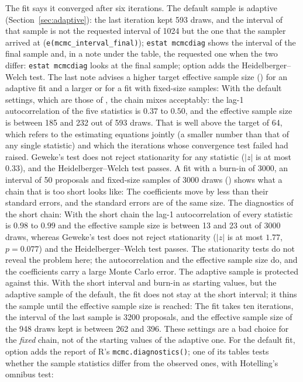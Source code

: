 The fit says it converged after six iterations. The default sample is adaptive (Section~\ref{sec:adaptive}): the last iteration kept 593 draws, and the interval of that sample is not the requested interval of 1024 but the one that the sampler arrived at (\texttt{e(mcmc\_interval\_final)}); \texttt{estat mcmcdiag} shows the interval of the final sample and, in a note under the table, the requested one when the two differ:
\texttt{estat mcmcdiag} looks at the final sample; option  adds the Heidelberger--Welch test. The last note advises a higher target effective sample size () for an adaptive fit and a larger  or  for a fit with fixed-size samples:
With the default settings, which are those of \ergm{}, the chain mixes acceptably: the lag-1 autocorrelation of the five statistics is $0.37$ to $0.50$, and the effective sample size is between 185 and 232 out of 593 draws. That is well above the target of 64, which refers to the estimating equations jointly (a smaller number than that of any single statistic) and which the iterations whose convergence test failed had raised. Geweke's test does not reject stationarity for any statistic ($|z|$ is at most $0.33$), and the Heidelberger--Welch test passes. A fit with a burn-in of 3000, an interval of 50 proposals and fixed-size samples of 3000 draws () shows what a chain that is too short looks like:
The coefficients move by less than their standard errors, and the standard errors are of the same size. The diagnostics of the short chain:
With the short chain the lag-1 autocorrelation of every statistic is $0.98$ to $0.99$ and the effective sample size is between 13 and 23 out of 3000 draws, whereas Geweke's test does not reject stationarity ($|z|$ is at most $1.77$, $p=0.077$) and the Heidelberger--Welch test passes. The stationarity tests do not reveal the problem here; the autocorrelation and the effective sample size do, and the coefficients carry a large Monte Carlo error. The adaptive sample is protected against this. With the short interval and burn-in as starting values, but the adaptive sample of the default, the fit does not stay at the short interval; it thins the sample until the effective sample size is reached:
The fit takes ten iterations, the interval of the last sample is 3200 proposals, and the effective sample size of the 948 draws kept is between 262 and 396. These settings are a bad choice for the \emph{fixed} chain, not of the starting values of the adaptive one. For the default fit, option  adds the report of R's \texttt{mcmc.diagnostics()}; one of its tables tests whether the sample statistics differ from the observed ones, with Hotelling's omnibus test:
